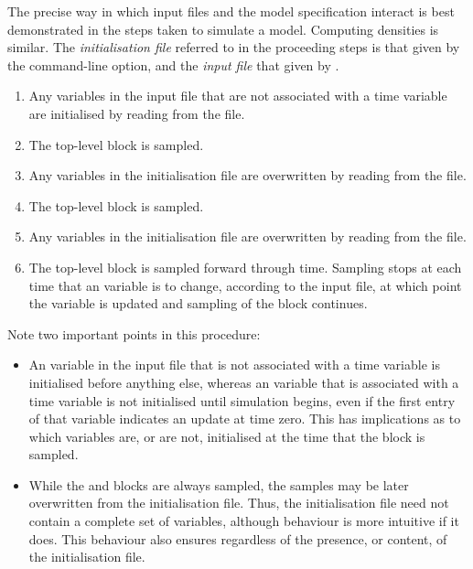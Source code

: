 The precise way in which input files and the model specification interact is
best demonstrated in the steps taken to simulate a model. Computing densities
is similar. The \emph{initialisation file} referred to in the proceeding steps
is that given by the  command-line option, and the
\emph{input file} that given by .
\begin{enumerate}
\item Any  variables in the input file that are not associated with
  a time variable are initialised by reading from the file.
\item The  top-level block is sampled.
\item Any  variables in the initialisation file are overwritten
  by reading from the file.
\item The  top-level block is sampled.
\item Any  variables in the initialisation file are overwritten
  by reading from the file.
\item The  top-level block is sampled forward through
  time. Sampling stops at each time that an  variable is to
  change, according to the input file, at which point the 
  variable is updated and sampling of the  block
  continues.
\end{enumerate}

Note two important points in this procedure:
\begin{itemize}
\item An  variable in the input file that is not associated with a
  time variable is initialised before anything else, whereas an 
  variable that is associated with a time variable is not initialised until
  simulation begins, even if the first entry of that variable indicates an
  update at time zero. This has implications as to which 
  variables are, or are not, initialised at the time that the
   block is sampled.
\item While the  and  blocks are always
  sampled, the samples may be later overwritten from the initialisation
  file. Thus, the initialisation file need not contain a complete set of
  variables, although behaviour is more intuitive if it does. This behaviour
  also ensures  regardless of the presence, or content, of the
  initialisation file.
\end{itemize}

